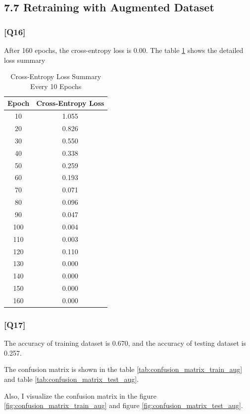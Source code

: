\documentclass{article}
\begin{document}
\subsection*{7.7 Retraining with Augmented Dataset}

\subsubsection*{[Q16]}

After 160 epochs, the cross-entropy loss is 0.00. The table \ref{tab:cross_entropy_loss_aug} shows the detailed loss summary

\begin{table}[ht]
    \centering
    \caption{Cross-Entropy Loss Summary Every 10 Epochs}
    \begin{tabular}{cc}
    \toprule
    Epoch & Cross-Entropy Loss \\
    \midrule
    10  & 1.055 \\
    20  & 0.826 \\
    30  & 0.550 \\
    40  & 0.338 \\
    50  & 0.259 \\
    60  & 0.193 \\
    70  & 0.071 \\
    80  & 0.096 \\
    90  & 0.047 \\
    100 & 0.004 \\
    110 & 0.003 \\
    120 & 0.110 \\
    130 & 0.000 \\
    140 & 0.000 \\
    150 & 0.000 \\
    160 & 0.000 \\
    \bottomrule
    \end{tabular}
    \label{tab:cross_entropy_loss_aug}
\end{table}


\subsubsection*{[Q17]}
The accuracy of training dataset is 0.670, and the accuracy of testing dataset is 0.257.

The confusion matrix is shown in the table \ref{tab:confusion_matrix_train_aug} and table \ref{tab:confusion_matrix_test_aug}.

Also, I visualize the confusion matrix in the figure \ref{fig:confusion_matrix_train_aug} and figure \ref{fig:confusion_matrix_test_aug}.
\end{document}
